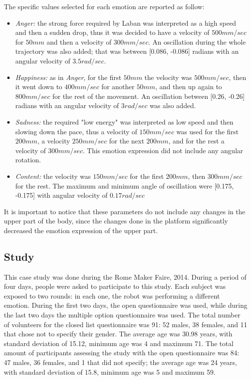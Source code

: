 The specific values selected for each emotion are reported as follow:

\begin{itemize}
	
	\item \textit{\textit{Anger}:} the strong force required by Laban was interpreted as a high speed and then a sudden drop, thus it was decided to have a velocity of $500mm/sec$ for $50mm$ and then a velocity of $300mm/sec$. An oscillation during the whole trajectory was also added; that was between [0.086, -0.086] radians with an angular velocity of $3.5 rad/sec$.
	
	\item \textit{\textit{Happiness}:} as in \textit{Anger}, for the first $50mm$ the velocity was $500mm/sec$, then it went down to $400mm/sec$ for another $50mm$, and then up again to $800mm/sec$ for the rest of the movement. 
	An oscillation between [0.26, -0.26] radians with an angular velocity of $3rad/sec$ was also added.
	
	\item \textit{Sadness:} the required "low energy" was interpreted as low speed and then slowing down the pace, thus a velocity of $150mm/sec$ was used for the first $200mm$, a velocity $250mm/sec$ for the next $200mm$, and for the rest a velocity of $300mm/sec$. This emotion expression did not include any angular rotation.
	
	\item \textit{Content:} the velocity was $150mm/sec$ for the first $200mm$, then $300mm/sec$ for the rest. The maximum and minimum angle of oscillation were [0.175, -0.175] with angular velocity of $0.17rad/sec$
\end{itemize}

It is important to notice that these parameters do not include any changes in the upper part of the body, since the changes done in the platform significantly decreased the emotion expression of the upper part.

\subsection{Study}

This case study was done during the Rome Maker Faire, 2014. During a period of four days, people were asked to participate to this study. Each subject was exposed to two rounds: in each one, the robot was performing a different emotion. During the first two days, the open questionnaire was used, while during the last two days the multiple option questionnaire was used. The total number of volunteers for the closed list questionnaire was 91: 52 males, 38 females, and 11 that chose not to specify their gender. The average age was 30.98 years, with standard deviation of 15.12, minimum age was 4 and maximum 71. The total amount of participants assessing the study with the open questionnaire was 84: 47 males, 36 females, and 1 that did not specify; the average age was 24 years, with standard deviation of 15.8, minimum age was 5 and maximum 59. 

